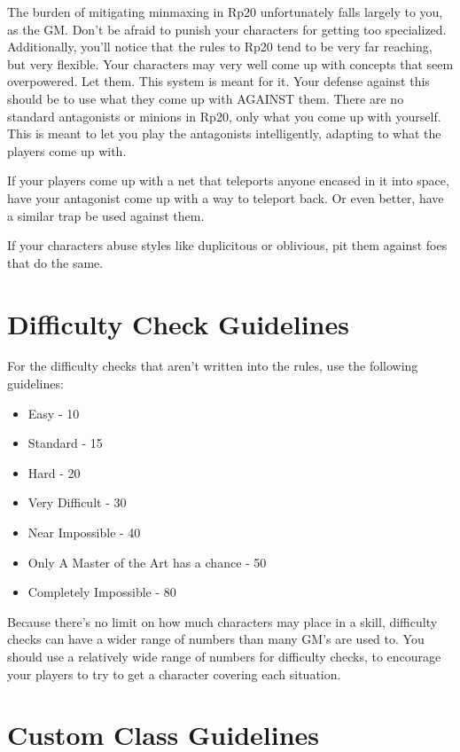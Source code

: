 The burden of mitigating minmaxing in Rp20 unfortunately falls largely to you, as the GM. Don’t be afraid to punish your characters for getting too specialized. Additionally, you’ll notice that the rules to Rp20 tend to be very far reaching, but very flexible. Your characters may very well come up with concepts that seem overpowered. Let them. This system is meant for it. Your defense against this should be to use what they come up with AGAINST them.
There are no standard antagonists or minions in Rp20, only what you come up with yourself. This is meant to let you play the antagonists intelligently, adapting to what the players come up with.

If your players come up with a net that teleports anyone encased in it into space, have your antagonist come up with a way to teleport back. Or even better, have a similar trap be used against them.

If your characters abuse styles like duplicitous or oblivious, pit them against foes that do the same.

\section{Difficulty Check Guidelines}
For the difficulty checks that aren’t written into the rules, use the following guidelines:
\begin{itemize}
\item Easy - 10
\item Standard - 15
\item Hard - 20
\item Very Difficult - 30
\item Near Impossible - 40
\item Only A Master of the Art has a chance - 50
\item Completely Impossible - 80
\end{itemize}
Because there’s no limit on how much characters may place in a skill, difficulty checks can have a wider range of numbers than many GM’s are used to. You should use a relatively wide range of numbers for difficulty checks, to encourage your players to try to get a character covering each situation.

\section{Custom Class Guidelines}
